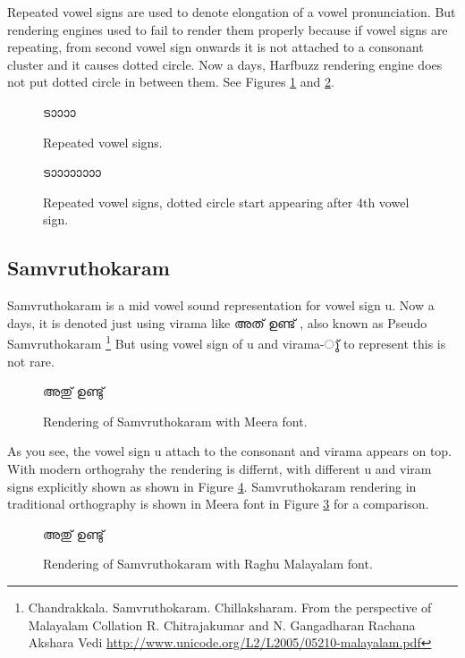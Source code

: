 Repeated vowel signs are used to denote elongation of a vowel pronunciation. But rendering engines used to fail to render them properly because if vowel signs are repeating, from second vowel sign onwards it is not attached to a consonant cluster and it causes dotted circle. Now a days, Harfbuzz rendering engine does not put dotted circle in between them. See Figures \ref{elongatedvowel-dotted} and \ref{elongated-nodotted}.

\begin{figure}[h]
  \centering
  {\meera\textexample ടാാാാ}\\
  \caption{Repeated vowel signs.}
  \label{elongatedvowel-dotted}
\end{figure}

\begin{figure}[h]
  \centering
  {\meera\textexample ടാാാാാാാാ}\\
  \caption{Repeated vowel signs, dotted circle start appearing after 4th vowel sign.}
  \label{elongated-nodotted}
\end{figure}


\subsection {Samvruthokaram}
\label{Samvruthokaram}
Samvruthokaram is a mid vowel sound representation for vowel sign u. Now a
days, it is denoted just using virama like {\malayalam അത് ഉണ്ട് }, also known as
Pseudo Samvruthokaram
\footnote{Chandrakkala. Samvruthokaram. Chillaksharam.
From the perspective of Malayalam Collation
R. Chitrajakumar and N. Gangadharan
Rachana Akshara Vedi \url{http://www.unicode.org/L2/L2005/05210-malayalam.pdf}}
But using vowel sign of u and virama-{\malayalam ു്} to represent this is not
rare.

\begin{figure}[h!]
  \centering
  {\meera\textexample  അതു് ഉണ്ടു് }\\
  \caption{Rendering of Samvruthokaram with Meera font.}
  \label{SamvruthokaramTraditional}
\end{figure}

As you see, the vowel sign u attach to the consonant and virama appears on top.
With modern orthograhy the rendering is differnt, with different u and viram
signs explicitly shown as shown in Figure \ref{SamvruthokaramModern}.
Samvruthokaram rendering in traditional orthography is shown in Meera font in
Figure \ref{SamvruthokaramTraditional} for a comparison.

\begin{figure}[h!]
  \centering
  {\raghumalayalam\textexample  അതു് ഉണ്ടു് }\\
  \caption{Rendering of Samvruthokaram with Raghu Malayalam font.}
  \label{SamvruthokaramModern}
\end{figure}

